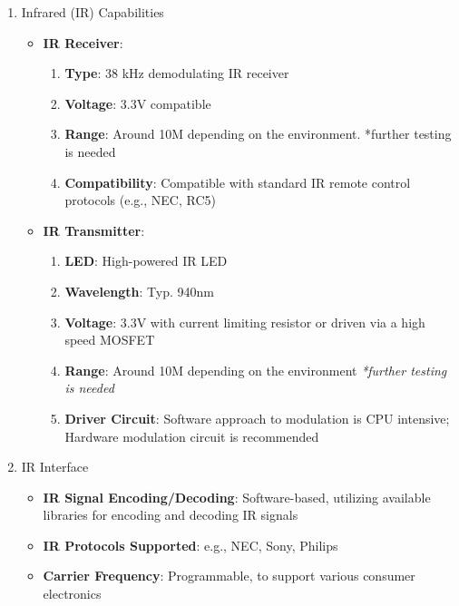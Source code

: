 \documentclass[conference]{IEEEtran}
\begin{document}
\begin{enumerate}[label=\arabic*.]
\begin{enumerate}[label=\alph*.]
\item Infrared (IR) Capabilities\\
\begin{itemize}
\item \textbf{IR Receiver}:\\
\begin{enumerate}[label=\roman*.]
\item \textbf{Type}: 38 kHz demodulating IR receiver\\
\item \textbf{Voltage}: 3.3V compatible\\
\item \textbf{Range}: Around 10M depending on the environment. *further testing is needed\\
\item \textbf{Compatibility}: Compatible with standard IR remote control protocols (e.g., NEC, RC5)\\
\end{enumerate}
\item \textbf{IR Transmitter}:\\
\begin{enumerate}[label=\roman*.]
\item \textbf{LED}: High-powered IR LED\\
\item \textbf{Wavelength}: Typ. 940nm\\
\item \textbf{Voltage}: 3.3V with current limiting resistor or driven via a high speed MOSFET\\
\item \textbf{Range}:  Around 10M depending on the environment \textit{*further testing is needed}\\
\item \textbf{Driver Circuit}: Software approach to modulation is CPU intensive; Hardware modulation circuit is recommended\\
\end{enumerate}
\end{itemize}

\item IR Interface\\
\begin{itemize}
\item \textbf{IR Signal Encoding/Decoding}: Software-based, utilizing available libraries for encoding and decoding IR signals\\
\item \textbf{IR Protocols Supported}: e.g., NEC, Sony, Philips\\
\item \textbf{Carrier Frequency}: Programmable, to support various consumer electronics\\
\end{itemize}


\end{enumerate}
\end{enumerate}
\end{document}
